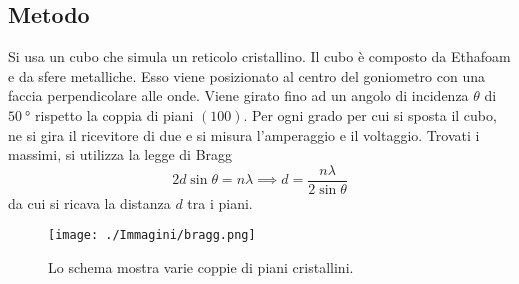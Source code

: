 \documentclass[a4paper]{article}
\begin{document}
\subsection{Metodo}
Si usa un cubo che simula un reticolo cristallino. Il cubo è composto da Ethafoam e da sfere metalliche. Esso viene posizionato al centro del goniometro con una faccia perpendicolare alle onde. Viene girato fino ad un angolo di incidenza $\theta$ di $\SI{50}{\degree}$ rispetto la coppia di piani $(100)$. Per ogni grado per cui si sposta il cubo, ne si gira il ricevitore di due e si misura l'amperaggio e il voltaggio. Trovati i massimi, si utilizza la legge di Bragg
\[
	2d\sin\theta = n\lambda \implies d=\frac{n\lambda}{2 \sin \theta}
\]
da cui si ricava la distanza $d$ tra i piani.
\begin{figure}[h]
    \centering
    \texttt{[image: ./Immagini/bragg.png]}
    \caption[Piani cristallini]{Lo schema mostra varie coppie di piani cristallini.}
\end{figure}
\end{document}
